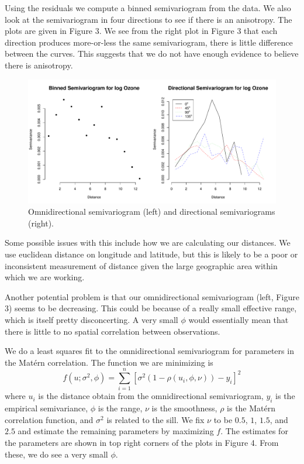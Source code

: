 \documentclass[12pt]{article}
\begin{document}
Using the residuals we compute a binned semivariogram from the data. We also look at the semivariogram in four directions to see if there is an anisotropy. The plots are given in Figure 3. We see from the right plot in Figure 3 that each direction produces more-or-less the same semivariogram, there is little difference between the curves. This suggests that we do not have enough evidence to believe there is anisotropy.

\begin{figure}[ht]
\begin{center}
\includegraphics[scale=0.5]{figs/variogram.pdf}
\end{center}
\caption{Omnidirectional semivariogram (left) and directional semivariograms (right).}
\end{figure}

Some possible issues with this include how we are calculating our distances. We use euclidean distance on longitude and latitude, but this is likely to be a poor or inconsistent measurement of distance given the large geographic area within which we are working.
\bigskip

Another potential problem is that our omnidirectional semivariogram (left, Figure 3) seems to be decreasing. This could be because of a really small effective range, which is itself pretty disconcerting. A very small $\phi$ would essentially mean that there is little to no spatial correlation between observations.
\bigskip

We do a least squares fit to the omnidirectional semivariogram for parameters in the Mat{\'e}rn correlation. The function we are minimizing is
\[ f(u; \sigma^2,\phi) = \sum_{i=1}^n\left[\sigma^2 (1 - \rho(u_i, \phi, \nu)) - y_i\right]^2 \]
where $u_i$ is the distance obtain from the omnidirectional semivariogram, $y_i$ is the empirical semivariance, $\phi$ is the range, $\nu$ is the smoothness, $\rho$ is the Mat{\'e}rn correlation function, and $\sigma^2$ is related to the sill. We fix $\nu$ to be $0.5$, $1$, $1.5$, and $2.5$ and estimate the remaining parameters by maximizing $f$. The estimates for the parameters are shown in top right corners of the plots in Figure 4. From these, we do see a very small $\phi$.
\end{document}
